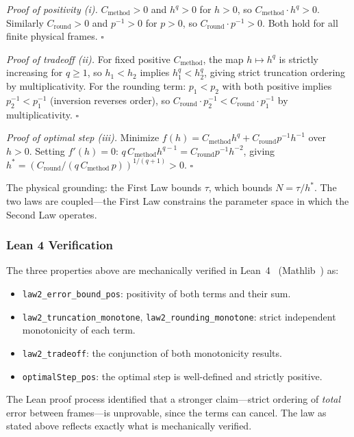 \documentclass[12pt]{article}
\theoremstyle{lawstyle}
\theoremstyle{conjstyle}
\theoremstyle{predstyle}
\begin{document}
\textit{Proof of positivity (i).} $C_{\mathrm{method}} > 0$ and $h^q > 0$ for $h > 0$, so
$C_{\mathrm{method}} \cdot h^q > 0$. Similarly $C_{\mathrm{round}} > 0$ and $p^{-1} > 0$ for
$p > 0$, so $C_{\mathrm{round}} \cdot p^{-1} > 0$. Both hold for all finite physical frames. $\square$

\textit{Proof of tradeoff (ii).} For fixed positive $C_{\mathrm{method}}$, the map $h \mapsto h^q$
is strictly increasing for $q \geq 1$, so $h_1 < h_2$ implies $h_1^q < h_2^q$, giving strict
truncation ordering by multiplicativity. For the rounding term: $p_1 < p_2$ with both positive
implies $p_2^{-1} < p_1^{-1}$ (inversion reverses order), so $C_{\mathrm{round}} \cdot p_2^{-1} <
C_{\mathrm{round}} \cdot p_1^{-1}$ by multiplicativity. $\square$

\textit{Proof of optimal step (iii).} Minimize $f(h) = C_{\mathrm{method}} h^q + C_{\mathrm{round}} p^{-1} h^{-1}$
over $h > 0$. Setting $f'(h) = 0$: $q\, C_{\mathrm{method}} h^{q-1} = C_{\mathrm{round}} p^{-1} h^{-2}$,
giving $h^* = (C_{\mathrm{round}} / (q\, C_{\mathrm{method}}\, p))^{1/(q+1)} > 0$. $\square$

The physical grounding: the First Law bounds $\tau$, which bounds $N = \tau/h^*$. The two
laws are coupled---the First Law constrains the parameter space in which the Second Law operates.

\subsubsection*{Lean 4 Verification}

The three properties above are mechanically verified in Lean~4~\cite{lean4} (Mathlib~\cite{mathlib2020}) as:
\begin{itemize}
  \item \texttt{law2\_error\_bound\_pos}: positivity of both terms and their sum.
  \item \texttt{law2\_truncation\_monotone}, \texttt{law2\_rounding\_monotone}: strict
        independent monotonicity of each term.
  \item \texttt{law2\_tradeoff}: the conjunction of both monotonicity results.
  \item \texttt{optimalStep\_pos}: the optimal step is well-defined and strictly positive.
\end{itemize}
The Lean proof process identified that a stronger claim---strict ordering of \emph{total}
error between frames---is unprovable, since the terms can cancel. The law as stated above
reflects exactly what is mechanically verified.
\end{document}
